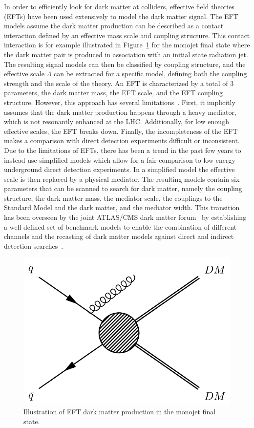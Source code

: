 In order to efficiently look for dark matter at colliders, effective field theories (EFTs) have been used extensively to model the dark matter signal. The EFT models assume the dark matter production can be described as a contact interaction defined by an effective mass scale and coupling structure. This contact interaction is for example illustrated in Figure~\ref{fig:monojet_diagram} for the monojet final state where the dark matter pair is produced in association with an initial state radiation jet. The resulting signal models can then be classified by coupling structure, and the effective scale $\Lambda$ can be extracted for a specific model, defining both the coupling strength and the scale of the theory. An EFT is characterized by a total of 3 parameters, the dark matter mass, the EFT scale, and the EFT coupling structure. However, this approach has several limitations~\cite{Busoni:2013lha,Busoni:2014sya,Busoni:2014haa}. First, it implicitly assumes that the dark matter production happens through a heavy mediator, which is not resonantly enhanced at the \ac{LHC}. Additionally, for low enough effective scales, the EFT breaks down. Finally, the incompleteness of the EFT makes a comparison with direct detection experiments difficult or inconsistent. Due to the limitations of EFTs, there has been a trend in the past few years to instead use simplified models which allow for a fair comparison to low energy underground direct detection experiments. In a simplified model the effective scale is then replaced by a physical mediator. The resulting models contain six parameters that can be scanned to search for dark matter, namely the coupling structure, the dark matter mass, the mediator scale, the couplings to the Standard Model and the dark matter, and the mediator width. This transition has been overseen by the joint \acs{ATLAS}/\acs{CMS} dark matter forum~\cite{Abercrombie:2015wmb} by establishing a well defined set of benchmark models to enable the combination of different channels and the recasting of dark matter models against direct and indirect detection searches~\cite{Boveia:2016mrp}.

\begin{figure}[ht]
  \centering
 \includegraphics[width=.4\textwidth]{monojet.png} 
 \caption{Illustration of EFT dark matter production in the monojet final state.}
 \label{fig:monojet_diagram}
\end{figure}

